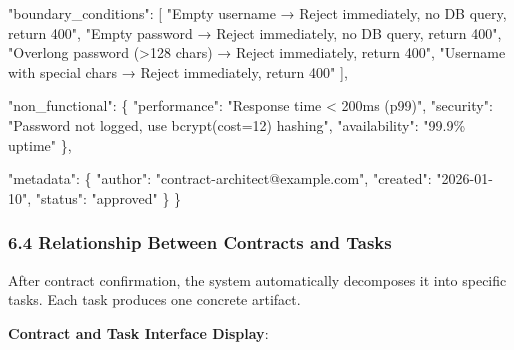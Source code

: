 \documentclass[
]{article}
\newenvironment{Shaded}{}{}
\newcommand{\DataTypeTok}[1]{\textcolor[rgb]{0.56,0.13,0.00}{#1}}
\newcommand{\FunctionTok}[1]{\textcolor[rgb]{0.02,0.16,0.49}{#1}}
\newcommand{\OtherTok}[1]{\textcolor[rgb]{0.00,0.44,0.13}{#1}}
\newcommand{\StringTok}[1]{\textcolor[rgb]{0.25,0.44,0.63}{#1}}
\begin{document}
\begin{Shaded}
\begin{Highlighting}[]
  \DataTypeTok{"boundary\_conditions"}\FunctionTok{:} \OtherTok{[}
    \StringTok{"Empty username → Reject immediately, no DB query, return 400"}\OtherTok{,}
    \StringTok{"Empty password → Reject immediately, no DB query, return 400"}\OtherTok{,}
    \StringTok{"Overlong password (\textgreater{}128 chars) → Reject immediately, return 400"}\OtherTok{,}
    \StringTok{"Username with special chars → Reject immediately, return 400"}
  \OtherTok{]}\FunctionTok{,}
  
  \DataTypeTok{"non\_functional"}\FunctionTok{:} \FunctionTok{\{}
    \DataTypeTok{"performance"}\FunctionTok{:} \StringTok{"Response time \textless{} 200ms (p99)"}\FunctionTok{,}
    \DataTypeTok{"security"}\FunctionTok{:} \StringTok{"Password not logged, use bcrypt(cost=12) hashing"}\FunctionTok{,}
    \DataTypeTok{"availability"}\FunctionTok{:} \StringTok{"99.9\% uptime"}
  \FunctionTok{\},}
  
  \DataTypeTok{"metadata"}\FunctionTok{:} \FunctionTok{\{}
    \DataTypeTok{"author"}\FunctionTok{:} \StringTok{"contract{-}architect@example.com"}\FunctionTok{,}
    \DataTypeTok{"created"}\FunctionTok{:} \StringTok{"2026{-}01{-}10"}\FunctionTok{,}
    \DataTypeTok{"status"}\FunctionTok{:} \StringTok{"approved"}
  \FunctionTok{\}}
\FunctionTok{\}}
\end{Highlighting}
\end{Shaded}

\hypertarget{64-relationship-between-contracts-and-tasks}{%
\subsubsection{6.4 Relationship Between Contracts and
Tasks}\label{64-relationship-between-contracts-and-tasks}}

After contract confirmation, the system automatically decomposes it into
specific tasks. Each task produces one concrete artifact.

\textbf{Contract and Task Interface Display}:
\end{document}
